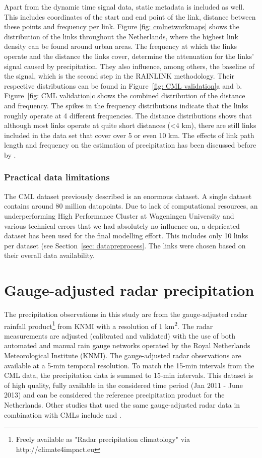 \documentclass[twocolumn, 10pt, a4paper]{memoir}
\begin{document}
	Apart from the dynamic time signal data, static metadata is included as well. This includes coordinates of the start and end point of the link, distance between these points and frequency per link. Figure \ref{fig: cmlnetworkmaps} shows the distribution of the links throughout the Netherlands, where the highest link density can be found around urban areas. The frequency at which the links operate and the distance the links cover, determine the attenuation for the links' signal caused by precipitation. They also influence, among others, the baseline of the signal, which is the second step in the RAINLINK methodology. Their respective distributions can be found in Figure~\ref{fig: CML validation}a and b. Figure~\ref{fig: CML validation}c shows the combined distribution of the distance and frequency. The spikes in the frequency distributions indicate that the links roughly operate at 4 different frequencies. The distance distributions shows that although most links operate at quite short distances (<4 km), there are still links included in the data set that cover over 5 or even 10 km. The effects of link path length and frequency on the estimation of precipitation has been discussed before by .
		
	\subsubsection*{Practical data limitations}
	The CML dataset previously described is an enormous dataset. A single dataset contains around 80 million datapoints. Due to lack of computational resources, an underperforming High Performance Cluster at Wageningen University and various technical errors that we had absolutely no influence on, a depricated dataset has been used for the final modelling effort. This includes only 10 links per dataset (see Section~\ref{sec: datapreprocess}. The links were chosen based on their overall data availability.
	
	\section{Gauge-adjusted radar precipitation} \label{sec: Ref prec data}
	The precipitation observations in this study are from the gauge-adjusted radar rainfall product\footnote{Freely available as "Radar precipitation climatology" via http://climate4impact.eu} from KNMI with a resolution of 1 km\textsuperscript{2}. The radar measurements are adjusted (calibrated and validated) with the use of both automated and manual rain gauge networks operated by the Royal Netherlands Meteorological Institute (KNMI). The gauge-adjusted radar observations are available at a 5-min temporal resolution. To match the 15-min intervals from the CML data, the precipitation data is summed to 15-min intervals. This dataset is of high quality, fully available in the considered time period (Jan 2011 - June 2013) and can be considered the reference precipitation product for the Netherlands. Other studies that used the same gauge-adjusted radar data in combination with CMLs include  and .
\end{document}
